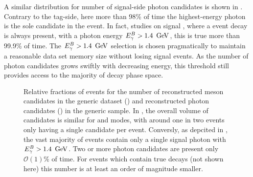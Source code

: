 A similar distribution for number of signal-side photon candidates is shown in .
Contrary to the tag-side, here more than 98\% of time the highest-energy photon is the sole candidate in the event.
In fact, studies on signal \MC, where a \BtoXsgamma event decay is always present, with a photon energy ${E^B_{\gamma}}>1.4~\mathrm{\,Ge\kern -0.1em V}$, this is true more than  99.9\% of time.
The ${E^B_{\gamma}}>1.4~\mathrm{\,Ge\kern -0.1em V}$ selection is chosen pragmatically to maintain a reasonable data set memory size without losing signal events.
As the number of photon candidates grows swiftly with decreasing energy, this threshold still provides access to the majority of \BtoXsgamma decay phase space.
\begin{figure}[htbp!]
    \centering
    \caption{\label{fig:reco_candidates} Relative fractions of events for the number of 
    reconstructed \B meson candidates in the generic \MC dataset () and
    reconstructed photon candidates () in the generic \MC sample.
    In , the overall volume of candidates is similar for \feiBp and \feiBz modes, 
    with around one in two events only having a single candidate per event.
    Conversly, as depcited in ,
    the vast majority of events contain only a single signal photon with ${E^B_{\gamma}}>1.4~\mathrm{\,Ge\kern -0.1em V}$.
    Two or more photon candidates are present only $\mathcal{O}(1)\%$ of time.
    For events which contain true \BtoXsgamma decays (not shown here) this number is at least an order of magnitude smaller.
    }
\end{figure}

